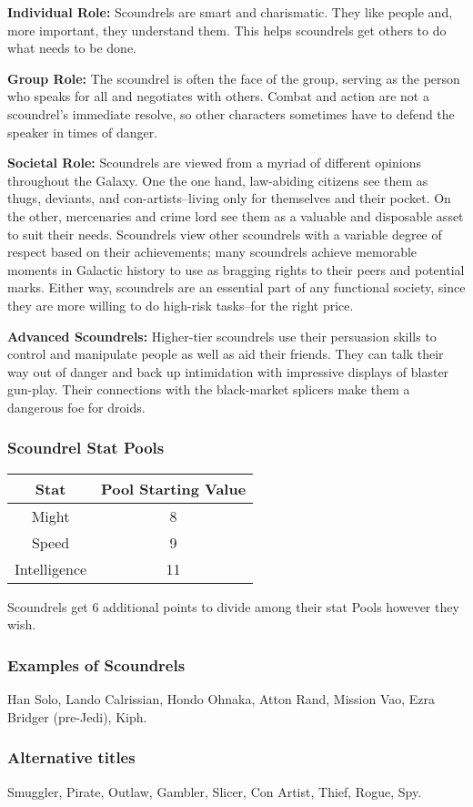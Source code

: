\documentclass[a4paper,10pt,final,twocolumn,oneside]{book}
\newcommand{\statPool}[5]
{
	\subsubsection*{#1 Stat Pools}
	\label{subsub:#1StatPools}
	\begin{center}
	\begin{tabular}{ |c|c| }
	\hline
	\textbf{Stat} & \textbf{Pool Starting Value} \\
	\hline \hline
	Might & #2 \\
	\hline
 	Speed & #3  \\
 	\hline
 	Intelligence & #4  \\
 	\hline
	\end{tabular}
	\end{center}
	#1s get #5 additional points to divide among their stat Pools however they wish.
}
\newcommand{\itemLine}[2]{\textbf{#1:}{ #2}\par}
\begin{document}
\itemLine{Individual Role}{Scoundrels are smart and charismatic. They like people and, more important, they understand them. This helps scoundrels get others to do what needs
to be done.}

\itemLine{Group Role}{The scoundrel is often the face of the group, serving as the person who speaks for all and negotiates with others. Combat and action are not a scoundrel's immediate resolve, so other characters sometimes have to defend the speaker in times of danger.}

\itemLine{Societal Role}{Scoundrels are viewed from a myriad of different opinions throughout the Galaxy. One the one hand, law-abiding citizens see them as thugs, deviants, and con-artists--living only for themselves and their pocket. On the other, mercenaries and crime lord see them as a valuable and disposable asset to suit their needs. Scoundrels view other scoundrels with a variable degree of respect based on their achievements; many scoundrels achieve memorable moments in Galactic history to use as bragging rights to their peers and potential marks. Either way, scoundrels are an essential part of any functional society, since they are more willing to do high-risk tasks--for the right price.}

\itemLine{Advanced Scoundrels}{Higher-tier scoundrels use their persuasion skills to control and manipulate people as well as aid their friends. They can talk their way out of danger and back up intimidation with impressive displays of blaster gun-play. Their connections with the black-market splicers make them a dangerous foe for droids.}

\statPool{Scoundrel}{8}{9}{11}{6}

\subsubsection*{Examples of Scoundrels}
\label{subsub:scoundrelExamples}

Han Solo, Lando Calrissian, Hondo Ohnaka, Atton Rand, Mission Vao, Ezra Bridger (pre-Jedi), Kiph.

\subsubsection*{Alternative titles}
\label{subsub:scoundrelAlternative}

Smuggler, Pirate, Outlaw, Gambler, Slicer, Con Artist, Thief, Rogue, Spy.

\end{document}
